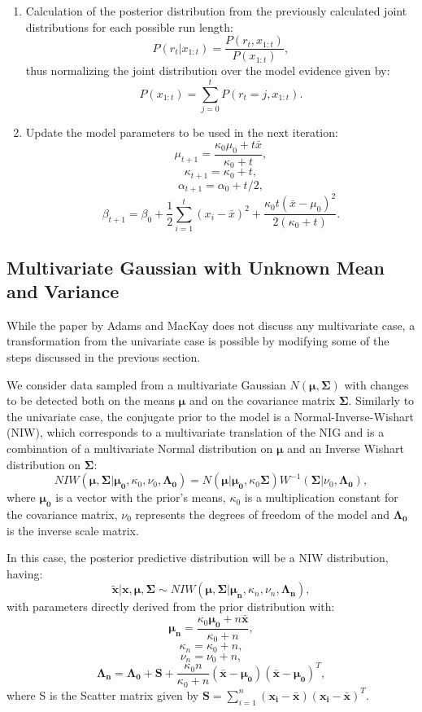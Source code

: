 \documentclass[a4paper]{article}
\begin{document}
\begin{enumerate}
\item Calculation of the posterior distribution from the previously calculated joint distributions for each possible run length:
\[P(r_t | x_{1:t}) = \frac{P(r_t , x_{1:t})} {P(x_{1:t})},\]
thus normalizing the joint distribution over the model evidence given by:
\[P(x_{1:t}) = \sum_{j=0}^{t} P(r_t = j , x_{1:t}).\]

\item Update the model parameters to be used in the next iteration:
\[\mu_{t+1} = \frac{\kappa_0\mu_0 + t\bar{x}}{\kappa_0 + t}, \]
\[\kappa_{t+1} = \kappa_0 + t,\]
\[\alpha_{t+1} = \alpha_0 + t/2,\]
\[\beta_{t+1} = \beta_0 + \frac{1}{2} \sum_{i=1}^{t} (x_i - \bar{x})^2 + \frac{\kappa_0t(\bar{x} - \mu_0)^2}{2(\kappa_0 + t)}. \]

\end{enumerate}


\subsection{Multivariate Gaussian with Unknown Mean and Variance}

While the paper by Adams and MacKay does not discuss any multivariate case, a transformation from the univariate case is possible by modifying some of the steps discussed in the previous section.

We consider data sampled from a multivariate Gaussian $N(\boldsymbol{\mu}, \boldsymbol{\Sigma})$ with changes to be detected both on the means $\boldsymbol{\mu}$ and on the covariance matrix $\boldsymbol{\Sigma}$. Similarly to the univariate case, the conjugate prior to the model is a Normal-Inverse-Wishart (NIW), which corresponds to a multivariate translation of the NIG and is a combination of a multivariate Normal distribution on $\boldsymbol{\mu}$ and an Inverse Wishart distribution on $\boldsymbol{\Sigma}$:
\[NIW(\boldsymbol{\mu}, \boldsymbol{\Sigma} | \boldsymbol{\mu_0}, \kappa_0, \nu_0, \boldsymbol{\Lambda_0}) = N(\boldsymbol{\mu} | \boldsymbol{\mu_0}, \kappa_0\boldsymbol{\Sigma})W^{-1}(\boldsymbol{\Sigma} | \nu_0, \boldsymbol{\Lambda_0}),\]
where $\boldsymbol{\mu_0}$ is a vector with the prior's means, $\kappa_0$ is a multiplication constant for the covariance matrix, $\nu_0$ represents the degrees of freedom of the model and $\boldsymbol{\Lambda_0}$ is the inverse scale matrix.

In this case, the posterior predictive distribution will be a NIW distribution, having:
\[\boldsymbol{\tilde{x}} | \boldsymbol{x}, \boldsymbol{\mu}, \boldsymbol{\Sigma}  \sim NIW(\boldsymbol{\mu}, \boldsymbol{\Sigma} | \boldsymbol{\mu_n}, \kappa_n, \nu_n, \boldsymbol{\Lambda_n}),\]
with parameters directly derived from the prior distribution with:
\[\boldsymbol{\mu_n} = \frac{\kappa_0\boldsymbol{\mu_0} + n\boldsymbol{\bar{x}}}{\kappa_0 + n}, \]
\[\kappa_n = \kappa_0 + n,\]
\[\nu_n = \nu_0 + n,\]
\[\boldsymbol{\Lambda_n} = \boldsymbol{\Lambda_0} + \boldsymbol{S} + \frac{\kappa_0n}{\kappa_0 + n}(\boldsymbol{\bar{x}} - \boldsymbol{\mu_0})(\boldsymbol{\bar{x}} - \boldsymbol{\mu_0})^T, \]
where S is the Scatter matrix given by \(\boldsymbol{S} = \sum_{i=1}^{n}(\boldsymbol{x_i} - \boldsymbol{\bar{x}})(\boldsymbol{x_i} - \boldsymbol{\bar{x}})^T\).
\end{document}

